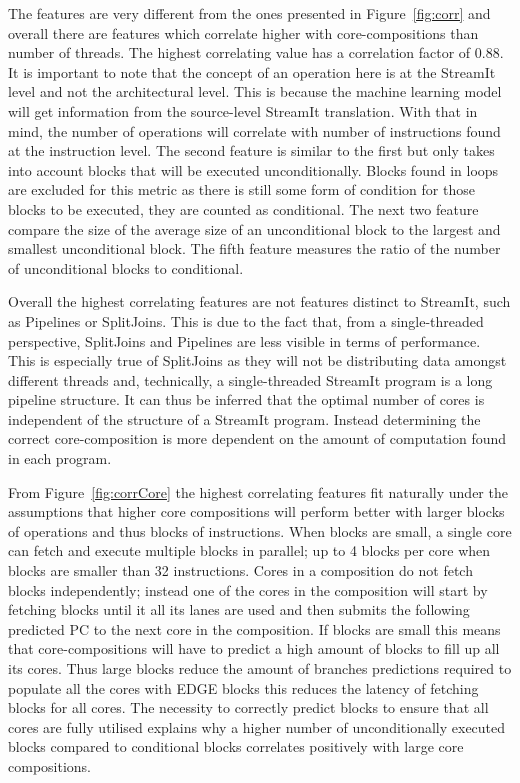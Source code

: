 The features are very different from the ones presented in Figure~\ref{fig:corr} and overall there are features which correlate higher with core-compositions than number of threads.
The highest correlating value has a correlation factor of 0.88.
It is important to note that the concept of an operation here is at the StreamIt level and not the architectural level.
This is because the machine learning model will get information from the source-level StreamIt translation.
With that in mind, the number of operations will correlate with number of instructions found at the instruction level.
The second feature is similar to the first but only takes into account blocks that will be executed unconditionally.
Blocks found in loops are excluded for this metric as there is still some form of condition for those blocks to be executed, they are counted as conditional.
The next two feature compare the size of the average size of an unconditional block to the largest and smallest unconditional block.
The fifth feature measures the ratio of the number of unconditional blocks to conditional.

Overall the highest correlating features are not features distinct to StreamIt, such as Pipelines or SplitJoins.
This is due to the fact that, from a single-threaded perspective, SplitJoins and Pipelines are less visible in terms of performance.
This is especially true of SplitJoins as they will not be distributing data amongst different threads and, technically, a single-threaded StreamIt program is a long pipeline structure.
It can thus be inferred that the optimal number of cores is independent of the structure of a StreamIt program.
Instead determining the correct core-composition is more dependent on the amount of computation found in each program.

From Figure~\ref{fig:corrCore} the highest correlating features fit naturally under the assumptions that higher core compositions will perform better with larger blocks of operations and thus blocks of instructions.
When blocks are small, a single core can fetch and execute multiple blocks in parallel; up to 4 blocks per core when blocks are smaller than 32 instructions.
Cores in a composition do not fetch blocks independently; instead one of the cores in the composition will start by fetching blocks until it all its lanes are used and then submits the following predicted PC to the next core in the composition.
If blocks are small this means that core-compositions will have to predict a high amount of blocks to fill up all its cores.
Thus large blocks reduce the amount of branches predictions required to populate all the cores with EDGE blocks this reduces the latency of fetching blocks for all cores.
The necessity to correctly predict blocks to ensure that all cores are fully utilised explains why a higher number of unconditionally executed blocks compared to conditional blocks correlates positively with large core compositions.

